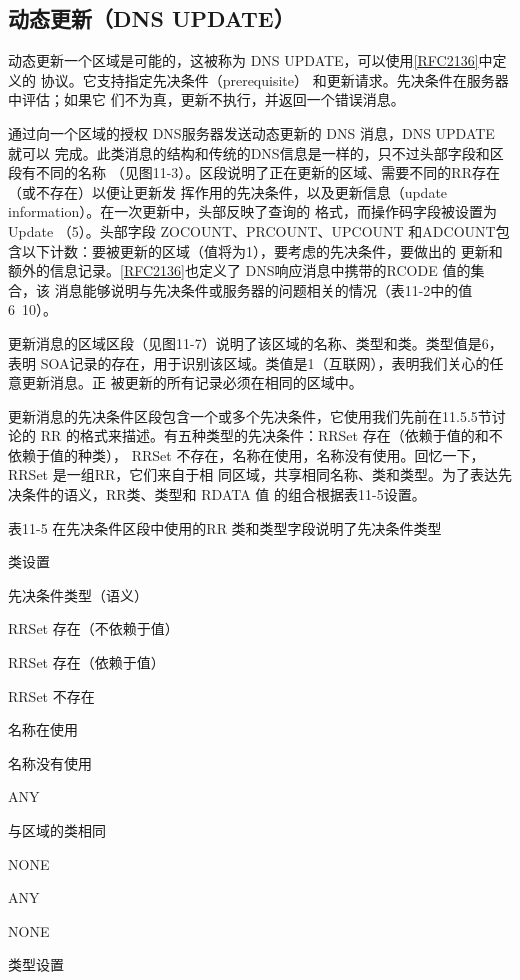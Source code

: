 \subsection{动态更新（DNS UPDATE）}

动态更新一个区域是可能的，这被称为 DNS UPDATE，可以使用\href{https://www.rfc-editor.org/rfc/rfc2136}{[RFC2136]}中定义的
协议。它支持指定先决条件（prerequisite） 和更新请求。先决条件在服务器中评估；如果它
们不为真，更新不执行，并返回一个错误消息。

通过向一个区域的授权 DNS服务器发送动态更新的 DNS 消息，DNS UPDATE 就可以
完成。此类消息的结构和传统的DNS信息是一样的，只不过头部字段和区段有不同的名称
（见图11-3）。区段说明了正在更新的区域、需要不同的RR存在（或不存在）以便让更新发
挥作用的先决条件，以及更新信息（update information）。在一次更新中，头部反映了查询的
格式，而操作码字段被设置为Update （5）。头部字段 ZOCOUNT、PRCOUNT、UPCOUNT
和ADCOUNT包含以下计数：要被更新的区域（值将为1），要考虑的先决条件，要做出的
更新和额外的信息记录。\href{https://www.rfc-editor.org/rfc/rfc2136}{[RFC2136]}也定义了 DNS响应消息中携带的RCODE 值的集合，该
消息能够说明与先决条件或服务器的问题相关的情况（表11-2中的值6~10）。

更新消息的区域区段（见图11-7）说明了该区域的名称、类型和类。类型值是6，表明
SOA记录的存在，用于识别该区域。类值是1（互联网），表明我们关心的任意更新消息。正
被更新的所有记录必须在相同的区域中。

更新消息的先决条件区段包含一个或多个先决条件，它使用我们先前在11.5.5节讨论的
RR 的格式来描述。有五种类型的先决条件：RRSet 存在（依赖于值的和不依赖于值的种类），
RRSet 不存在，名称在使用，名称没有使用。回忆一下，RRSet 是一组RR，它们来自于相
同区域，共享相同名称、类和类型。为了表达先决条件的语义，RR类、类型和 RDATA 值
的组合根据表11-5设置。

表11-5 在先决条件区段中使用的RR 类和类型字段说明了先决条件类型

类设置

先决条件类型（语义）

RRSet 存在（不依赖于值）

RRSet 存在（依赖于值）

RRSet 不存在

名称在使用

名称没有使用

ANY

与区域的类相同

NONE

ANY

NONE

类型设置

